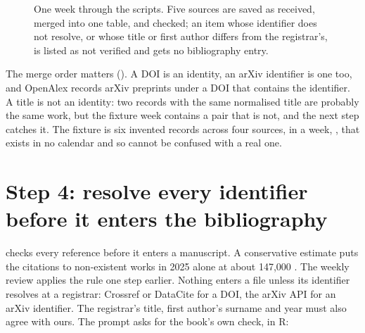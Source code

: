 \begin{figure}[htbp]
\centering
{}
\caption{One week through the scripts. Five sources are saved as received,
merged into one table, and checked; an item whose identifier does not resolve,
or whose title or first author differs from the registrar's, is listed as not
verified and gets no bibliography entry.}
\label{fig:weekpipeline}
\end{figure}

The merge order matters (). A DOI is an identity, an
arXiv identifier is one too, and OpenAlex records arXiv preprints under a DOI
that contains the identifier. A title is not an identity: two records with
the same normalised title are probably the same work, but the fixture week
contains a pair that is not, and the next step catches it. The fixture is six
invented records across four sources, in a week, , that exists
in no calendar and so cannot be confused with a real one.

\section{Step 4: resolve every identifier before it enters the bibliography}

 checks every reference before it enters a
manuscript. A conservative estimate puts the citations to non-existent works
in 2025 alone at about 147,000 \parencite{zhao2026citations}. The weekly
review applies the rule one step earlier. Nothing enters a  file
unless its identifier resolves at a registrar: Crossref or DataCite for a
DOI, the arXiv API for an arXiv identifier. The registrar's title, first
author's surname and year must also agree with ours. The prompt asks for the
book's own check, in R:

